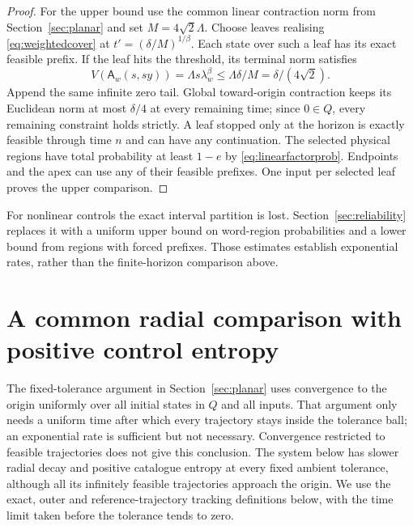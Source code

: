 \documentclass[11pt]{amsart}
\theoremstyle{definition}
\theoremstyle{remark}
\numberwithin{equation}{section}
\begin{document}
\begin{proof}
For the upper bound use the common linear contraction norm from
Section~\ref{sec:planar} and set $M=4\sqrt2\Lambda$.
Choose leaves realising \eqref{eq:weightedcover} at
$t'=(\delta/M)^{1/\beta}$. Each state over such a leaf
has its exact feasible prefix. If the leaf hits the threshold,
its terminal norm satisfies
\[
V(\mathsf A_w(s,sy))=\Lambda s\lambda_w^\beta
                    \le\Lambda\delta/M=\delta/(4\sqrt2).
\]
Append the same infinite zero tail. Global toward-origin contraction
keeps its Euclidean norm at most $\delta/4$ at every remaining
time; since $0\in Q$, every remaining constraint holds strictly.
A leaf stopped only at the horizon is exactly feasible through
time $n$ and can have any continuation. The selected physical
regions have total probability at least $1-e$ by
\eqref{eq:linearfactorprob}. Endpoints and the apex can use any
of their feasible prefixes. One input per selected leaf proves
the upper comparison.
\end{proof}

For nonlinear controls the exact interval partition is lost.
Section~\ref{sec:reliability} replaces it with a uniform upper
bound on word-region probabilities and a lower bound from regions
with forced prefixes. Those estimates establish exponential rates,
rather than the finite-horizon comparison above.

\section{A common radial comparison with positive control entropy}
\label{app:arsinh}
The fixed-tolerance argument in Section~\ref{sec:planar} uses convergence
to the origin uniformly over all initial states in $Q$ and all inputs.
That argument only needs a uniform time after which every trajectory
stays inside the tolerance ball; an exponential rate is sufficient
but not necessary. Convergence restricted to feasible trajectories
does not give this conclusion. The system below has slower radial
decay and positive catalogue entropy at every fixed ambient tolerance,
although all its infinitely feasible trajectories approach the origin.
We use the exact, outer and reference-trajectory tracking definitions
below, with the time limit taken before the tolerance tends to zero.
\end{document}
